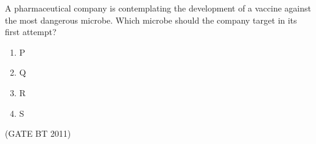 \documentclass[journal,12pt,onecolumn]{IEEEtran}
\begin{document}
\begin{enumerate}
A pharmaceutical company is contemplating the development of a vaccine against the most dangerous microbe. 
Which microbe should the company target in its first attempt?

\begin{multicols}{4}
  \begin{enumerate}
    \item P
    \item Q
    \item R
    \item S
  \end{enumerate}
\end{multicols} \hfill(GATE BT 2011)

\end{enumerate}
\end{document}
